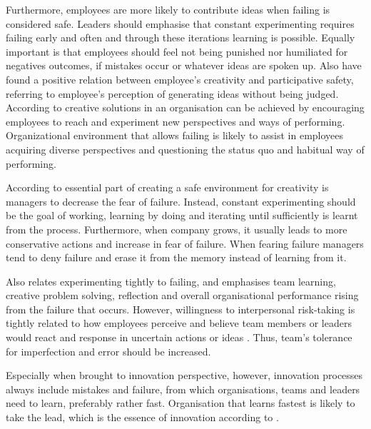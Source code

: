 Furthermore, employees are more likely to contribute ideas when failing is considered safe. Leaders should emphasise that constant experimenting requires failing early and often and through these iterations learning is possible. Equally important is that employees should feel not being punished nor humiliated for negatives outcomes, if mistakes occur or whatever ideas are spoken up. \citep{amabile2008creativity, amabile1996assessing} Also \citet{de2001minority} have found a positive relation between employee's creativity and participative safety, referring to employee's perception of generating ideas without being judged. According to \citet{amabile1996assessing} creative solutions in an organisation can be achieved by encouraging employees to reach and experiment new perspectives and ways of performing. Organizational environment that allows failing is likely to assist in employees acquiring diverse perspectives and questioning the status quo and habitual way of performing. 

According to \citet{amabile2008creativity} essential part of creating a safe environment for creativity is managers to decrease the fear of failure. Instead, constant experimenting should be the goal of working, learning by doing and iterating until sufficiently is learnt from the process. Furthermore, when company grows, it usually leads to more conservative actions and increase in fear of failure. When fearing failure managers tend to deny failure and erase it from the memory instead of learning from it. \citep{amabile2008creativity} 

Also \citet{edmondson1999psychological} relates experimenting tightly to failing, and emphasises team learning, creative problem solving, reflection and overall organisational performance rising from the failure that occurs. However, willingness to interpersonal risk-taking is tightly related to how employees perceive and believe team members or leaders would react and response in uncertain actions or ideas \citet{edmondson1999psychological}. Thus, team's tolerance for imperfection and error should be increased. 

Especially when brought to innovation perspective, however, innovation processes always include mistakes and failure, from which organisations, teams and leaders need to learn, preferably rather fast. Organisation that learns fastest is likely to take the lead, which is the essence of innovation according to \citet{buijs2007innovation}.
